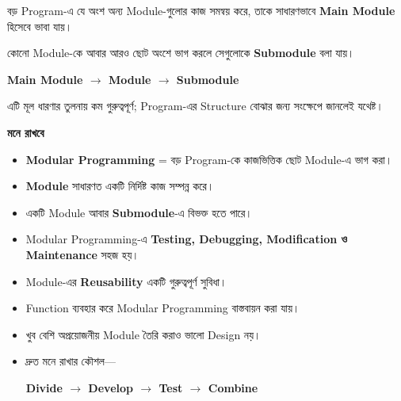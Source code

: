 
বড় Program-এ যে অংশ অন্য Module-গুলোর কাজ সমন্বয় করে,
তাকে সাধারণভাবে \textbf{Main Module} হিসেবে ভাবা যায়।

কোনো Module-কে আবার আরও ছোট অংশে ভাগ করলে সেগুলোকে
\textbf{Submodule} বলা যায়।

\begin{center}

\textbf{
Main Module
\(\longrightarrow\)
Module
\(\longrightarrow\)
Submodule
}

\end{center}

এটি মূল ধারণার তুলনায় কম গুরুত্বপূর্ণ;
Program-এর Structure বোঝার জন্য সংক্ষেপে জানলেই যথেষ্ট।

\begin{rememberbox}

\textbf{\color{deepOrange}মনে রাখবে}

\begin{itemize}

\item \textbf{Modular Programming} =
বড় Program-কে কাজভিত্তিক ছোট Module-এ ভাগ করা।

\item \textbf{Module} সাধারণত একটি নির্দিষ্ট কাজ সম্পন্ন করে।

\item একটি Module আবার \textbf{Submodule}-এ বিভক্ত হতে পারে।

\item Modular Programming-এ
\textbf{Testing, Debugging, Modification ও Maintenance} সহজ হয়।

\item Module-এর \textbf{Reusability} একটি গুরুত্বপূর্ণ সুবিধা।

\item Function ব্যবহার করে Modular Programming বাস্তবায়ন করা যায়।

\item খুব বেশি অপ্রয়োজনীয় Module তৈরি করাও ভালো Design নয়।

\item দ্রুত মনে রাখার কৌশল—

\begin{center}

\textbf{
Divide
\(\longrightarrow\)
Develop
\(\longrightarrow\)
Test
\(\longrightarrow\)
Combine
}

\end{center}

\end{itemize}

\end{rememberbox}

\small

